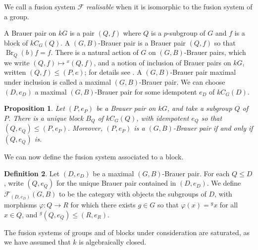 \documentclass{amsart}
\theoremstyle{plain}\newtheorem{theorem}{Theorem}[section]
\theoremstyle{plain}\newtheorem{conjecture}[theorem]{Conjecture}
\theoremstyle{plain}\newtheorem{corollary}[theorem]{Corollary}
\theoremstyle{plain}\newtheorem{lemma}[theorem]{Lemma}
\theoremstyle{plain}\newtheorem{proposition}[theorem]{Proposition}
\theoremstyle{plain}\newtheorem{statement}[theorem]{}
\theoremstyle{definition}\newtheorem{definition}[theorem]{Definition}
\theoremstyle{definition}\newtheorem{example}[theorem]{Example}
\theoremstyle{definition}\newtheorem{examples}[theorem]{Examples}
\theoremstyle{definition}\newtheorem{notation}[theorem]{Notation}
\theoremstyle{definition}\newtheorem{remark}[theorem]{Remark}
\theoremstyle{definition}\newtheorem{remarks}[theorem]{Remarks}
\theoremstyle{definition}\newtheorem{question}[theorem]{Question}
\theoremstyle{definition}\newtheorem{propositiondefinition}[theorem]{Definition/Proposition}
\begin{document}
We call a fusion system $\mathcal{F}$ \emph{realisable} when it is isomorphic to the fusion system of a group.

A Brauer pair on $kG$ is a pair $(Q,f)$ where $Q$ is a $p$-subgroup of $G$ and $f$ is a block of $kC_G(Q)$. A $(G,B)$-Brauer pair is a Brauer pair $(Q,f)$ so that $\operatorname{Br}_Q(b)f =f$. There is a natural action of $G$ on $(G,B)$-Brauer pairs, which we write $(Q,f) \mapsto \hspace{0pt}^x(Q,f)$, and a notion of inclusion of Brauer pairs on $kG$, written $(Q,f) \leq (P,e)$; for details see \cite[6.3]{linckelmann}. A $(G,B)$-Brauer pair maximal under inclusion is called a maximal $(G,B)$-Brauer pair. We can choose $(D,e_D)$ a maximal $(G,B)$-Brauer pair for some idempotent $e_D$ of $kC_G(D)$.
\begin{proposition}\cite[6.3.3, 6.3.6]{linckelmann}\label{uniqueidemp}
Let $(P,e_P)$ be a Brauer pair on $kG$, and take a subgroup $Q$ of $P$. There is a unique block $B_Q$ of $kC_G(Q)$, with idempotent $e_Q$ so that $(Q,e_Q) \leq (P,e_P)$. Moreover, $(P,e_P)$ is a $(G,B)$-Brauer pair if and only if $(Q,e_Q)$ is.
\end{proposition}
We can now define the fusion system associated to a block.
\begin{definition}\cite[8.5.1]{linckelmann}
    Let $(D,e_D)$ be a maximal $(G,B)$-Brauer pair. For each $Q \leq D$, write $(Q,e_Q)$ for the unique Brauer pair contained in $(D,e_D)$. We define $\mathcal{F}_{(D,e_D)}(G,B)$ to be the category with objects the subgroups of $D$, with morphisms $\varphi:Q \rightarrow R$ for which there exists $g \in G$ so that $\varphi(x)= \hspace{0pt}^gx$ for all $x \in Q$, and $\hspace{0pt}^g(Q,e_Q) \leq (R, e_R)$.
\end{definition}

The fusion systems of groups and of blocks under consideration are saturated, as we have assumed that $k$ is algebraically closed. 
\end{document}
